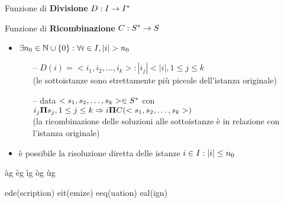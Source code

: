 \begin{description}
    \item{Funzione di \textbf{Divisione}} $ D : I{} \to I{}^*$
    \item{Funzione di \textbf{Ricombinazione}} $ C : S{}^* \to S{}$
\end{description}

\begin{itemize}
    \item $\exists n_0 \in \mathbb{N} \cup \{0\} : \forall i \in I{}, |i| > n_0 $
        \begin{itemize}[noitemsep,topsep=0pt,parsep=0pt,partopsep=0pt]
            \item[--] $ D(i)=<i_1, i_2, \dots, i_k>:|i_j|<|i|, 1 \leq j \leq k$ \\
                (le sottoistanze sono strettamente più piccole dell'istanza originale)
            \item[--] data $ <s_1, s_2, \dots, s_k> \in S{}^* $ con $i_j \bm{\Pi}{} s_j,  1 \leq j \leq k \Rightarrow i \bm{\Pi}{} C(<s_1, s_2, \dots, s_k>)$ \\
                (la ricombinazione delle soluzioni alle sottoistanze è in relazione con l'istanza originale)
        \end{itemize}
    \item è possibile la risoluzione diretta delle istanze $ i \in I{} : |i| \leq n_0 $
\end{itemize}

àg
èg
ìg
òg
ùg

ede(scription) eit(emize) eeq(uation) eal(ign)
